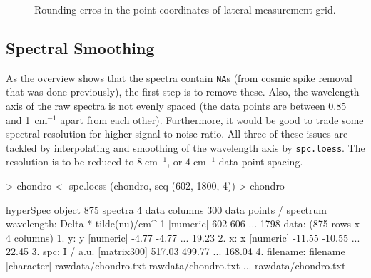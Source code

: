 \documentclass[english, a4paper, 10pt, headings=small, DIV11]{scrartcl}
\renewenvironment{Schunk}{\vspace{0pt}\begin{small}}{\end{small}\vspace{0pt}}
\newcommand{\Rcode}[2][]{\texorpdfstring{\nohyphens{#1\texttt{#2}}}{#2}}
\newcommand{\Rfunction}[2][]{\texorpdfstring{\nohyphens{#1\texttt{#2}}}{#2}}
\newcommand{\rcm}[1]{\ensuremath{#1\;\mathrm{cm^{-1}}}\xspace}
\begin{document}
\begin{figure}[tbh]
\caption{\label{fig:pointerror} Rounding erros in the point coordinates of lateral measurement grid.}
\end{figure}

\subsection{Spectral Smoothing}
As the overview shows that the spectra contain \Rcode{NA}s (from cosmic spike removal that was done previously), the first step is to remove these. Also, the wavelength axis of the raw spectra is not evenly spaced (the data points are between 0.85 and 1\,\rcm{} apart from each other). Furthermore, it would be good to trade some spectral resolution for higher signal to noise ratio. All three of these issues are tackled by interpolating and smoothing of the wavelength axis by \Rfunction{spc.loess}. The resolution is to be reduced to \rcm{8}, or \rcm{4} data point spacing.

\begin{Schunk}
\begin{Sinput}
> chondro <- spc.loess (chondro, seq (602, 1800, 4))
> chondro
\end{Sinput}
\begin{Soutput}
hyperSpec object
   875 spectra
   4 data columns
   300 data points / spectrum
wavelength: Delta * tilde(nu)/cm^-1 [numeric] 602 606 ... 1798 
data:  (875 rows x 4 columns)
   1. y: y [numeric] -4.77 -4.77 ... 19.23 
   2. x: x [numeric] -11.55 -10.55 ... 22.45 
   3. spc: I / a.u. [matrix300] 517.03 499.77 ... 168.04 
   4. filename: filename [character] rawdata/chondro.txt rawdata/chondro.txt ... rawdata/chondro.txt 
\end{Soutput}
\end{Schunk}
\end{document}
